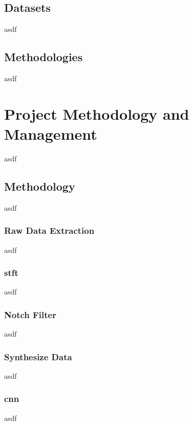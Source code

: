 \documentclass[12pt]{article}
\begin{document}
\subsection{Datasets}

asdf

\subsection{Methodologies}

asdf








\section{Project Methodology and Management}

asdf

\subsection{Methodology}

asdf

\subsubsection{Raw Data Extraction}

asdf

\subsubsection{\acrfull{stft}}

asdf

\subsubsection{Notch Filter}

asdf

\subsubsection{Synthesize Data}

asdf

\subsubsection{\acrfull{cnn}}

asdf
\end{document}
